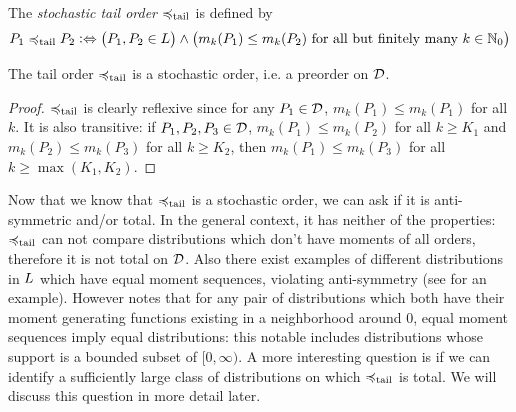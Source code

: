 \documentclass[a4paper]{scrreprt}
\begin{document}
    \begin{defn}[Stochastic Tail Order]
        The \emph{stochastic tail order} $\preccurlyeq_{\text{tail}}$ is defined by
        \begin{gather*}
            P_1 \preccurlyeq_{\text{tail}} P_2 \mathrel{\vcentcolon\Leftrightarrow} \bigl(P_1, P_2 \in L\bigr) \wedge \bigl(m_k(P_1) \leq m_k(P_2) \text{ for all but finitely many $k \in \mathbb{N}_0$}\bigr)
        \end{gather*}
    \end{defn}

    \begin{lemma}
        The tail order $\preccurlyeq_{\text{tail}}$ is a stochastic order, i.e. a preorder on $\mathcal{D}$.
    \end{lemma}
    \begin{proof}
        $\preccurlyeq_{\text{tail}}$ is clearly reflexive since for any $P_1 \in \mathcal{D}$, $m_k(P_1) \leq m_k(P_1)$ for all $k$.
        It is also transitive: if $P_1, P_2, P_3 \in \mathcal{D}$, $m_k(P_1) \leq m_k(P_2)$ for all $k \geq K_1$ and $m_k(P_2) \leq m_k(P_3)$ for all $k \geq K_2$, then $m_k(P_1) \leq m_k(P_3)$ for all $k \geq \max(K_1, K_2)$.
    \end{proof}
    
    Now that we know that $\preccurlyeq_{\text{tail}}$ is a stochastic order, we can ask if it is anti-symmetric and/or total.
    In the general context, it has neither of the properties: $\preccurlyeq_{\text{tail}}$ can not compare distributions which don't have moments of all orders, therefore it is not total on $\mathcal{D}$.
    Also there exist examples of different distributions in $L$ which have equal moment sequences, violating anti-symmetry (see \cite[p.49, 3.15]{bib:romanoCounterexamplesInProbability} for an example). However \cite{bib:rassGameRiskManagI} notes that for any pair of distributions which both have their moment generating functions existing in a neighborhood around 0, equal moment sequences imply equal distributions: this notable includes distributions whose support is a bounded subset of $[0, \infty)$.
    A more interesting question is if we can identify a sufficiently large class of distributions on which $\preccurlyeq_{\text{tail}}$ is total. We will discuss this question in more detail later.
    
\end{document}
